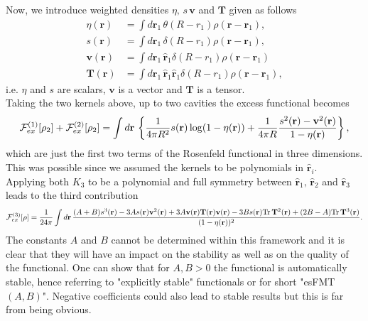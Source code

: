 \documentclass{article}
\begin{document}
Now, we introduce weighted densities $\eta,\,s\,\mathbf{v}$ and $\mathbf{T}$ given as follows
\begin{align}
	\eta(\mathbf{r}) &= \int d\mathbf{r}_1\,\theta(R-r_1)\rho(\mathbf{r}-\mathbf{r}_1),\\\nonumber
	s(\mathbf{r}) &= \int d\mathbf{r}_1\,\delta(R-r_1)\rho(\mathbf{r}-\mathbf{r}_1),\\\nonumber
	\mathbf{v}(\mathbf{r}) &= \int d\mathbf{r}_1\,\hat{\mathbf{r}}_1\delta(R-r_1)\rho(\mathbf{r}-\mathbf{r}_1)\\\nonumber
	\mathbf{T}(\mathbf{r}) &= \int d\mathbf{r}_1\,\hat{\mathbf{r}}_1 \hat{\mathbf{r}}_1\delta(R-r_1)\rho(\mathbf{r}-\mathbf{r}_1),
\end{align}
i.e. $\eta$ and $s$ are scalars, $\mathbf{v}$ is a vector and $\mathbf{T}$ is a tensor.\\
Taking the two kernels above, up to two cavities the excess functional becomes
\begin{equation}
	{\cal F}^{(1)}_{ex}[\rho_2]+{\cal F}^{(2)}_{ex}[\rho_2] = \int d\mathbf{r}\,\left\{\frac{1}{4\pi R^2}s(\mathbf{r})\log(1-\eta(\mathbf{r}))+\frac{1}{4\pi R}\frac{s^2(\mathbf{r})-\mathbf{v}^2(\mathbf{r})}{1-\eta(\mathbf{r})}\right\},
\end{equation}
which are just the first two terms of the Rosenfeld functional in three dimensions. This was possible since we assumed the kernels to be polynomials in $\hat{\mathbf{r}}_i$.\\
Applying both $K_3$ to be a polynomial and full symmetry between $\hat{\mathbf{r}}_1,\,\hat{\mathbf{r}}_2$ and $\hat{\mathbf{r}}_3$ leads to the third contribution
\begin{equation}
	{\cal F}^{(3)}_{ex}[\rho] = \frac{1}{24\pi}\int d\mathbf{r}\,\frac{(A+B)s^3(\mathbf{r})-3As(\mathbf{r})\mathbf{v}^2(\mathbf{r})+3A\mathbf{v}(\mathbf{r})\mathbf{T}(\mathbf{r})\mathbf{v}(\mathbf{r})-3Bs(\mathbf{r})\text{Tr}\,\mathbf{T}^2(\mathbf{r})+(2B-A)\text{Tr}\,\mathbf{T}^3(\mathbf{r})}{(1-\eta(\mathbf{r}))^2}.
\end{equation}
The constants $A$ and $B$ cannot be determined within this framework and it is clear that they will have an impact on the stability as well as on the quality of the functional. One can show that for $A,B>0$ the functional is automatically stable, hence referring to "explicitly stable" functionals or for short "esFMT$(A,B)$". Negative coefficients could also lead to stable results but this is far from being obvious.
\end{document}
